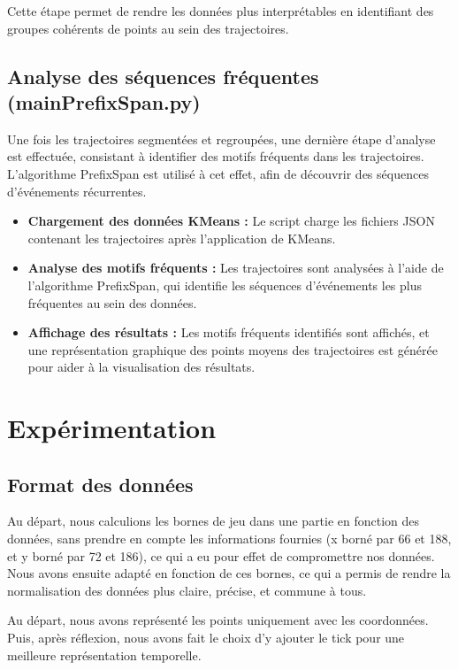 \documentclass{article}
\begin{document}
        Cette étape permet de rendre les données plus interprétables en identifiant des groupes cohérents de points au sein des trajectoires.
        
        \subsection{Analyse des séquences fréquentes (mainPrefixSpan.py)}
        
        Une fois les trajectoires segmentées et regroupées, une dernière étape d'analyse est effectuée, consistant à identifier des motifs fréquents dans les trajectoires. L'algorithme PrefixSpan est utilisé à cet effet, afin de découvrir des séquences d'événements récurrentes.
        
        \begin{itemize}
            \item \textbf{Chargement des données KMeans :} Le script charge les fichiers JSON contenant les trajectoires après l'application de KMeans.
            \item \textbf{Analyse des motifs fréquents :} Les trajectoires sont analysées à l'aide de l'algorithme PrefixSpan, qui identifie les séquences d'événements les plus fréquentes au sein des données.
            \item \textbf{Affichage des résultats :} Les motifs fréquents identifiés sont affichés, et une représentation graphique des points moyens des trajectoires est générée pour aider à la visualisation des résultats.
        \end{itemize}

    \section{Expérimentation}
        \subsection{Format des données}

            Au départ, nous calculions les bornes de jeu dans une partie en fonction des données, sans prendre en compte les informations fournies (x borné par 66 et 188, et y borné par 72 et 186), ce qui a eu pour effet de compromettre nos données. Nous avons ensuite adapté en fonction de ces bornes, ce qui a permis de rendre la normalisation des données plus claire, précise, et commune à tous.

            Au départ, nous avons représenté les points uniquement avec les coordonnées. Puis, après réflexion, nous avons fait le choix d’y ajouter le tick pour une meilleure représentation temporelle.
\end{document}
